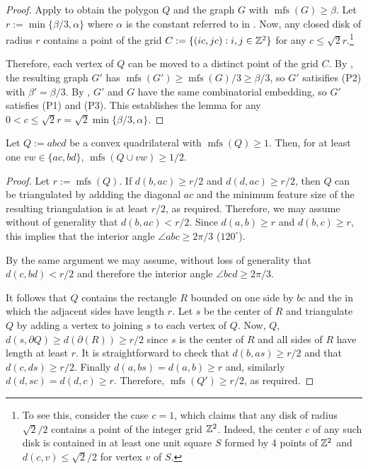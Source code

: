 \documentclass{article}
\DeclareMathOperator{\mfs}{mfs}
\begin{document}
\begin{proof}
    Apply  to obtain the polygon $Q$ and the graph $G$ with $\mfs(G)\ge \beta$.  Let $r:=\min\{\beta/3,\alpha\}$ where $\alpha$ is the constant referred to in .  Now, any closed disk of radius $r$ contains a point of the grid $C:=\{(ic,jc): i,j\in\mathbb{Z}^2\}$ for any $c\le \sqrt{2}r$.\footnote{To see this, consider the case $c=1$, which claims that any disk of radius $\sqrt{2}/2$ contains a point of the integer grid $\mathbb{Z}^2$.  Indeed, the center $c$ of any such disk is contained in at least one unit square $S$ formed by 4 points of $\mathbb{Z}^2$ and $d(c,v)\le \sqrt{2}/2$ for vertex $v$ of $S$.}

    Therefore, each vertex of $Q$ can be moved to a distinct point of the grid $C$.  By , the resulting graph $G'$ has $\mfs(G')\ge \mfs(G)/3\ge \beta/3$, so $G'$ satisifies (P2) with $\beta'=\beta/3$.  By , $G'$ and $G$ have the same combinatorial embedding, so $G'$ satisfies (P1) and (P3).  This establishes the lemma for any $0<c\le \sqrt{2}r = \sqrt{2}\min\{\beta/3,\alpha\}$.
\end{proof}


\begin{lem}
    Let $Q:=abcd$ be a convex quadrilateral with $\mfs(Q)\ge 1$. Then, for at least one $vw\in\{ac, bd\}$, $\mfs(Q\cup vw)\ge 1/2$.
\end{lem}

\begin{proof}
    Let $r:=\mfs(Q)$.  If $d(b,ac)\ge r/2$ and $d(d,ac)\ge r/2$, then $Q$ can be triangulated by addding the diagonal $ac$ and the minimum feature size of the resulting triangulation is at least $r/2$, as required.  Therefore, we may assume without of generality that $d(b,ac)< r/2$.  Since $d(a,b)\ge r$ and $d(b,c)\ge r$, this implies that the interior angle $\angle abc\ge 2\pi/3$ ($120^\circ$).

    By the same argument we may assume, without loss of generality that $d(c,bd) < r/2$ and therefore the interior angle $\angle bcd\ge 2\pi/3$.

    It follows that $Q$ contains the rectangle $R$ bounded on one side by $bc$ and the in which the adjacent sides have length $r$.  Let $s$ be the center of $R$ and triangulate $Q$ by adding a vertex to joining $s$ to each vertex of $Q$.  Now, $Q$, $d(s,\partial Q)\ge d(\partial(R))\ge r/2$ since $s$ is the center of $R$ and all sides of $R$ have length at least $r$.
    It is straightforward to check that $d(b,as)\ge r/2$ and that $d(c,ds)\ge r/2$.  Finally $d(a,bs)=d(a,b)\ge r$ and, similarly $d(d,sc)=d(d,c)\ge r$.  Therefore, $\mfs(Q')\ge r/2$, as required.
\end{proof}
\end{document}
